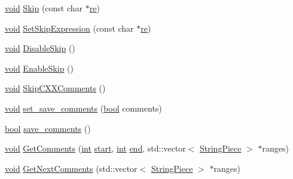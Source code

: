 \begin{DoxyCompactItemize}
\item 
\hyperlink{group__MOD__ISAPI_gacd6cdbf73df3d9eed42fa493d9b621a6}{void} \hyperlink{classpcrecpp_1_1Scanner_a116031271ccae4a4fd6729e7a1143df3}{Skip} (const char $\ast$\hyperlink{pcre_8txt_abd134207f74532a8b094676c4a2ca9ed}{re})
\item 
\hyperlink{group__MOD__ISAPI_gacd6cdbf73df3d9eed42fa493d9b621a6}{void} \hyperlink{classpcrecpp_1_1Scanner_a3f8b21b377d2362d4a77f85928077d0e}{Set\+Skip\+Expression} (const char $\ast$\hyperlink{pcre_8txt_abd134207f74532a8b094676c4a2ca9ed}{re})
\item 
\hyperlink{group__MOD__ISAPI_gacd6cdbf73df3d9eed42fa493d9b621a6}{void} \hyperlink{classpcrecpp_1_1Scanner_a3cdedb7c99f6cfbf22332b11fd917bee}{Disable\+Skip} ()
\item 
\hyperlink{group__MOD__ISAPI_gacd6cdbf73df3d9eed42fa493d9b621a6}{void} \hyperlink{classpcrecpp_1_1Scanner_a59daa1f1dba366d6cd9a2fa153f46d62}{Enable\+Skip} ()
\item 
\hyperlink{group__MOD__ISAPI_gacd6cdbf73df3d9eed42fa493d9b621a6}{void} \hyperlink{classpcrecpp_1_1Scanner_a33dd1e5e99865323ad482c316010884b}{Skip\+C\+X\+X\+Comments} ()
\item 
\hyperlink{group__MOD__ISAPI_gacd6cdbf73df3d9eed42fa493d9b621a6}{void} \hyperlink{classpcrecpp_1_1Scanner_ae9b70bef47934570c88ac1f778b64d0a}{set\+\_\+save\+\_\+comments} (\hyperlink{aplibtool_8c_ad5c9d4ba3dc37783a528b0925dc981a0}{bool} comments)
\item 
\hyperlink{aplibtool_8c_ad5c9d4ba3dc37783a528b0925dc981a0}{bool} \hyperlink{classpcrecpp_1_1Scanner_a1f83082a7a067916cdf4c2ba30332fef}{save\+\_\+comments} ()
\item 
\hyperlink{group__MOD__ISAPI_gacd6cdbf73df3d9eed42fa493d9b621a6}{void} \hyperlink{classpcrecpp_1_1Scanner_a973f73b9d755d432ad909ceb71924cbf}{Get\+Comments} (\hyperlink{pcre_8txt_a42dfa4ff673c82d8efe7144098fbc198}{int} \hyperlink{ab_8c_af9b96980fc724ad325115184a485da5f}{start}, \hyperlink{pcre_8txt_a42dfa4ff673c82d8efe7144098fbc198}{int} \hyperlink{group__apr__strings_ga87c7e3f3f70b6e7de10e3f56e3f4d7a4}{end}, std\+::vector$<$ \hyperlink{classpcrecpp_1_1StringPiece}{String\+Piece} $>$ $\ast$ranges)
\item 
\hyperlink{group__MOD__ISAPI_gacd6cdbf73df3d9eed42fa493d9b621a6}{void} \hyperlink{classpcrecpp_1_1Scanner_ae5178e0a122b0b5324fb0b8106155740}{Get\+Next\+Comments} (std\+::vector$<$ \hyperlink{classpcrecpp_1_1StringPiece}{String\+Piece} $>$ $\ast$ranges)
\end{DoxyCompactItemize}


